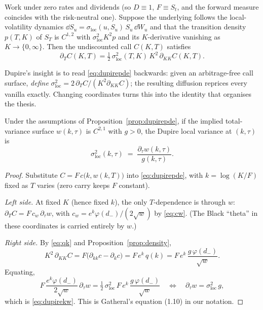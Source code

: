 \begin{proposition}\label{prop:dupirepde}
Work under zero rates and dividends (so $D\equiv1$, $F\equiv S_t$, and the forward measure
coincides with the risk-neutral one). Suppose the underlying follows the local-volatility
dynamics $\dd S_u=\sigma_{\mathrm{loc}}(u,S_u)\,S_u\,\dd W_u$ and that the transition density
$p(T,K)$ of $S_T$ is $C^{1,2}$ with $\sigma_{\mathrm{loc}}^2K^2p$ and its $K$-derivative
vanishing as $K\to\{0,\infty\}$. Then the undiscounted call $C(K,T)$ satisfies
\begin{equation}\label{eq:dupirepde}
\partial_T C(K,T)=\tfrac12\,\sigma_{\mathrm{loc}}^2(T,K)\,K^2\,\partial_{KK}C(K,T).
\end{equation}
\end{proposition}


Dupire's insight \cite{dupire1994} is to read \eqref{eq:dupirepde} backwards: given an
arbitrage-free call surface, \emph{define}
$\sigma^2_{\mathrm{loc}}=2\,\partial_TC/(K^2\partial_{KK}C)$; the resulting diffusion reprices
every vanilla exactly. Changing coordinates turns this into the identity that organises the
thesis.

\begin{proposition}\label{prop:dupire}
Under the assumptions of Proposition~\ref{prop:dupirepde}, if the implied total-variance
surface $w(k,\tau)$ is $C^{2,1}$ with $g>0$, the Dupire local variance at $(k,\tau)$ is
\begin{equation}\label{eq:dupirekw}
\sigma_{\mathrm{loc}}^{2}(k,\tau)\;=\;\frac{\partial_\tau w(k,\tau)}{g(k,\tau)} .
\end{equation}
\end{proposition}

\begin{proof}
Substitute $C=F\,c\bigl(k,w(k,T)\bigr)$ into \eqref{eq:dupirepde}, with $k=\log(K/F)$ fixed as
$T$ varies (zero carry keeps $F$ constant).

\emph{Left side.} At fixed $K$ (hence fixed $k$), the only $T$-dependence is through $w$:
$\partial_TC=F\,c_w\,\partial_\tau w$, with $c_w=e^{k}\varphi(d_-)/(2\sqrt w)$ by
\eqref{eq:cw}. (The Black ``theta'' in these coordinates is carried entirely by $w$.)

\emph{Right side.} By \eqref{eq:qk} and Proposition~\ref{prop:density},
\[
K^2\,\partial_{KK}C
=F\bigl(\partial_{kk}c-\partial_kc\bigr)
=F\,e^{k}\,q(k)
=F\,e^{k}\,\frac{g\,\varphi(d_-)}{\sqrt w}.
\]
Equating,
\[
F\,\frac{e^{k}\varphi(d_-)}{2\sqrt w}\,\partial_\tau w
=\tfrac12\,\sigma_{\mathrm{loc}}^2\,F\,e^{k}\,\frac{g\,\varphi(d_-)}{\sqrt w}
\quad\Longleftrightarrow\quad
\partial_\tau w=\sigma_{\mathrm{loc}}^2\,g,
\]
which is \eqref{eq:dupirekw}. This is Gatheral's equation (1.10) \cite{gatheral2006book} in our
notation.
\end{proof}

